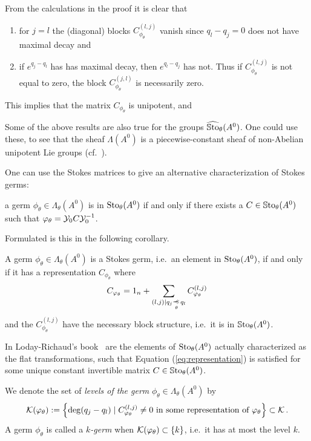 From the calculations in the proof it is clear that
\begin{enumerate}
  \item for $j=l$ the (diagonal) blocks $C_{\phi_\theta}^{(l,j)}$ vanish since
    $q_l-q_j=0$ does not have maximal decay and
  \item if $e^{q_j-q_l}$ has has maximal decay, then $e^{q_l-q_j}$ has not.
    Thus if $C_{\phi_\theta}^{(l,j)}$ is not equal to zero, the block
    $C_{\phi_\theta}^{(j,l)}$ is necessarily zero.
\end{enumerate}
This implies that the matrix $C_{\phi_\theta}$ is unipotent, and 
\begin{prop}
  Some of the above results are also true for the groups
  $\widehat{\operatorname{\mathbb{S}to}}_\theta(A^0)$. One could use these, to see that the sheaf
  $\Lambda(A^0)$ is a piecewise-constant sheaf of non-Abelian unipotent Lie
  groups (cf.~\cite[Prop.2.1]{Loday2004}).
\end{prop}

One can use the Stokes matrices to give an alternative characterization of
Stokes germs:
\begin{einr}
  a germ $\phi_\theta\in\Lambda_\theta(A^0)$ is in $\operatorname{Sto}_\theta(A^0)$ if and
  only if there exists a $C\in\operatorname{\mathbb{S}to}_\theta(A^0)$ such that
  $\varphi_\theta=\mathcal{Y}_{0}C\mathcal{Y}_{0}^{-1}$.
\end{einr}
Formulated is this in the following corollary.
\begin{cor}
  A germ $\phi_\theta\in\Lambda_\theta(A^0)$ is a Stokes germ, i.e.\ an element
  in $\operatorname{Sto}_\theta(A^0)$, if and only if it has a representation
  $C_{\phi_\theta}$ where
  \[
    C_{\phi_\theta}=
        1_n + \sum_{(l,j)\mid q_j\myrel{\theta}q_l}C_{\phi_\theta}^{(l,j)}
  \]
  and the $C_{\phi_\theta}^{(l,j)}$ have the necessary block structure, i.e.\ it
  is in $\operatorname{\mathbb{S}to}_\theta(A^0)$.
  \begin{s-rem}
    In Loday-Richaud's book~\cite[78]{Loday2014} are the elements of
    $\operatorname{Sto}_\theta(A^0)$ actually characterized as the flat transformations, such
    that Equation (\ref{eq:representation}) is satisfied for some unique
    constant invertible matrix $C\in\operatorname{\mathbb{S}to}_\theta(A^0)$.
  \end{s-rem}
\end{cor}

\begin{defn}
  We denote the set of \emph{levels of the germ}
  $\phi_{\theta}\in\Lambda_\theta(A^0)$ by
  \[
    \mathcal{K}(\varphi_\theta):= \left\{\deg(q_j-q_l)\mid C_{\varphi_\theta}^{(l,j)}\neq0
      \text{ in some representation of }\varphi_\theta\right\} \subset \mathcal{K} \,.
  \]
  A germ $\phi_\theta$ is called a \emph{$k$-germ} when
  $\mathcal{K}(\varphi_{\theta})\subset\{k\}$, i.e.\ it has at most the level $k$.
\end{defn}

